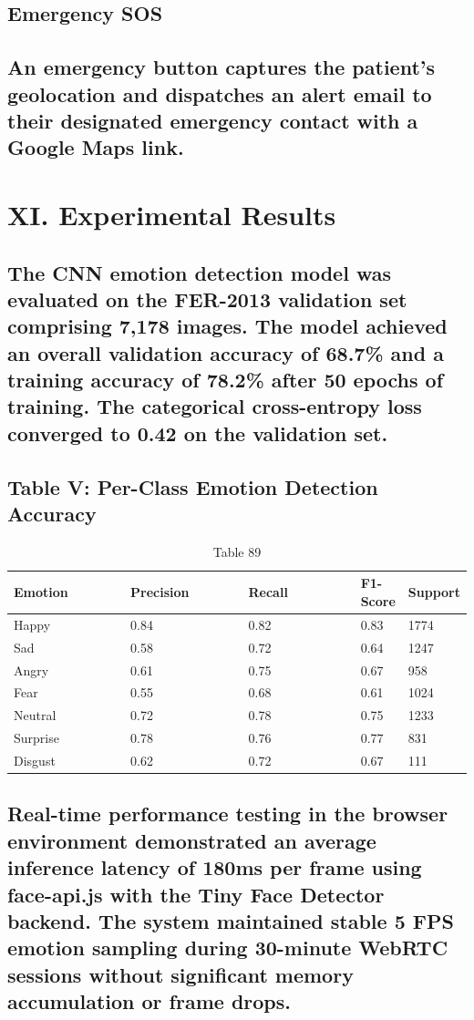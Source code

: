 \documentclass[conference]{IEEEtran}
\begin{document}
\subsection{Emergency SOS}
\subsection{An emergency button captures the patient's geolocation and dispatches an alert email to their designated emergency contact with a Google Maps link.}
\section{XI. Experimental Results}
\subsection{The CNN emotion detection model was evaluated on the FER-2013 validation set comprising 7,178 images. The model achieved an overall validation accuracy of 68.7\% and a training accuracy of 78.2\% after 50 epochs of training. The categorical cross-entropy loss converged to 0.42 on the validation set.}
\subsection{Table V: Per-Class Emotion Detection Accuracy}
\begin{table}[t]
\centering
\caption{Table 89}
\begin{tabular}{|p{0.3\linewidth}|p{0.3\linewidth}|p{0.3\linewidth}|p{0.3\linewidth}|p{0.3\linewidth}|}
\hline
Emotion & Precision & Recall & F1-Score & Support \\
\hline
Happy & 0.84 & 0.82 & 0.83 & 1774 \\
\hline
Sad & 0.58 & 0.72 & 0.64 & 1247 \\
\hline
Angry & 0.61 & 0.75 & 0.67 & 958 \\
\hline
Fear & 0.55 & 0.68 & 0.61 & 1024 \\
\hline
Neutral & 0.72 & 0.78 & 0.75 & 1233 \\
\hline
Surprise & 0.78 & 0.76 & 0.77 & 831 \\
\hline
Disgust & 0.62 & 0.72 & 0.67 & 111 \\
\hline
\end{tabular}
\end{table}
\subsection{Real-time performance testing in the browser environment demonstrated an average inference latency of 180ms per frame using face-api.js with the Tiny Face Detector backend. The system maintained stable 5 FPS emotion sampling during 30-minute WebRTC sessions without significant memory accumulation or frame drops.}
\end{document}
